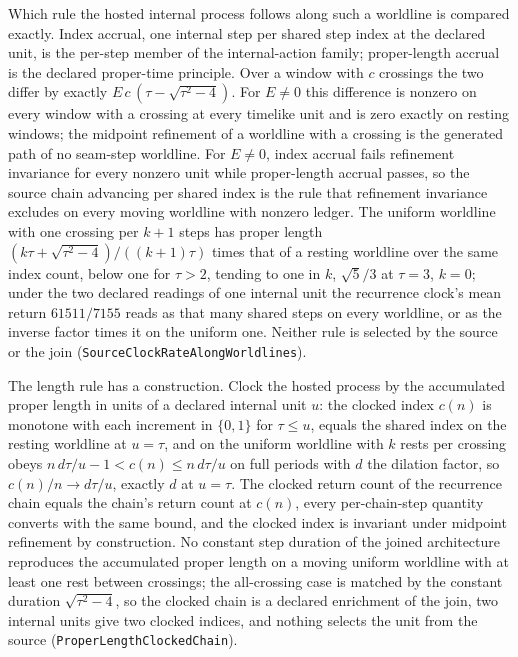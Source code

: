 \documentclass[11pt]{article}
\begin{document}
Which rule the hosted internal process follows along such a worldline is
compared exactly. Index accrual, one internal step per shared step index at
the declared unit, is the per-step member of the internal-action family;
proper-length accrual is the declared proper-time principle. Over a window
with \(c\) crossings the two differ by exactly \(E\,c\,(\tau-\sqrt{\tau^2-4})\).
For \(E\ne0\) this difference is nonzero on every window with a crossing at
every timelike unit and is zero exactly on resting windows; the midpoint
refinement of a worldline with a crossing is the generated path of no seam-step
worldline. For \(E\ne0\), index accrual fails refinement invariance for every
nonzero unit while proper-length accrual passes, so the source chain advancing
per shared index is the rule that refinement invariance excludes on every
moving worldline with nonzero ledger. The uniform
worldline with one crossing per \(k+1\) steps has proper length
\((k\tau+\sqrt{\tau^2-4})/((k+1)\tau)\) times that of a resting worldline over
the same index count, below one for \(\tau>2\), tending to one in \(k\),
\(\sqrt5/3\) at \(\tau=3\), \(k=0\); under the two declared readings of one
internal unit the recurrence clock's mean return \(61511/7155\) reads as that
many shared steps on every worldline, or as the inverse factor times it on
the uniform one. Neither rule is selected by the source or the join
(\texttt{SourceClockRateAlongWorldlines}).

The length rule has a construction. Clock the hosted process by the
accumulated proper length in units of a declared internal unit \(u\): the
clocked index \(c(n)\) is monotone with each increment in \(\{0,1\}\) for \(\tau\le u\),
equals the shared index on the resting worldline at \(u=\tau\), and on the
uniform worldline with \(k\) rests per crossing obeys
\(n\,d\tau/u-1<c(n)\le n\,d\tau/u\) on full periods with \(d\) the
dilation factor, so \(c(n)/n\to d\tau/u\), exactly \(d\) at \(u=\tau\). The
clocked return count of the recurrence chain equals the chain's return
count at \(c(n)\), every per-chain-step quantity converts with the same
bound, and the clocked index is invariant under midpoint refinement by
construction. No constant step duration of the joined architecture
reproduces the accumulated proper length on a moving uniform worldline with
at least one rest between crossings; the all-crossing case is matched by the
constant duration \(\sqrt{\tau^2-4}\),
so the clocked chain is a declared enrichment of the join, two internal
units give two clocked indices, and nothing selects the unit from the
source (\texttt{ProperLengthClockedChain}).
\end{document}
